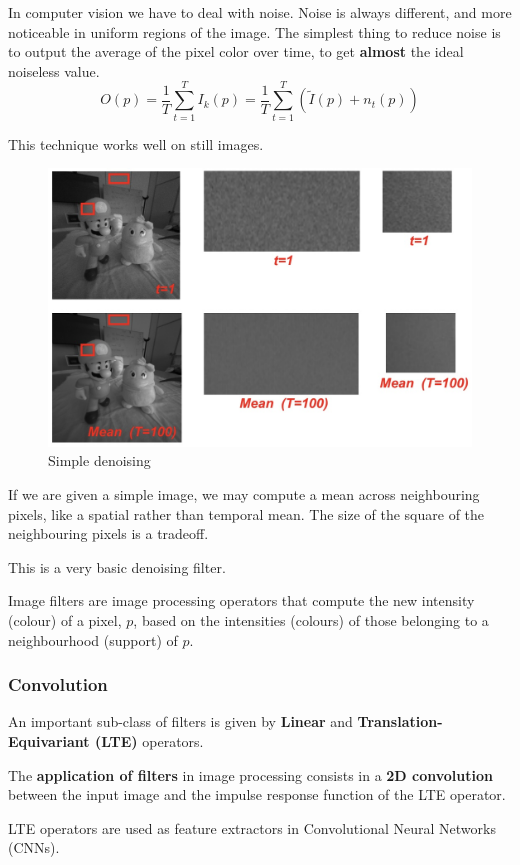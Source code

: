 \documentclass{article}
\begin{document}
In computer vision we have to deal with noise.
Noise is always different, and more noticeable in uniform regions of the image.
The simplest thing to reduce noise is to output the average of the pixel color over time, to get \textbf{almost} the ideal noiseless value.
$$O(p) = \frac{1}{T} \sum_{t=1}^{T} I_k(p) = \frac{1}{T} \sum_{t=1}^{T}(\tilde{I}(p) + n_t(p))$$

This technique works well on still images.

\begin{figure}[htbp]
  \centering
  \includegraphics[width=0.7\linewidth]{./img/denoising_simple.jpg}
  \caption{Simple denoising}
  \label{fig:denoising_simple}
\end{figure}

If we are given a simple image, we may compute a mean across neighbouring pixels, like a spatial rather than temporal mean.
The size of the square of the neighbouring pixels is a tradeoff.

This is a very basic denoising filter.

Image filters are image processing operators that compute the new intensity (colour) of a pixel, $p$, based on the intensities (colours) of those belonging to a neighbourhood (support) of $p$.

\subsubsection{Convolution}

An important sub-class of filters is given by \textbf{Linear} and \textbf{Translation-Equivariant (LTE)} operators.

The \textbf{application of filters} in image processing consists in a \textbf{2D convolution} between the input image and the impulse response function of the LTE operator.

LTE operators are used as feature extractors in Convolutional Neural Networks (CNNs).
\end{document}

